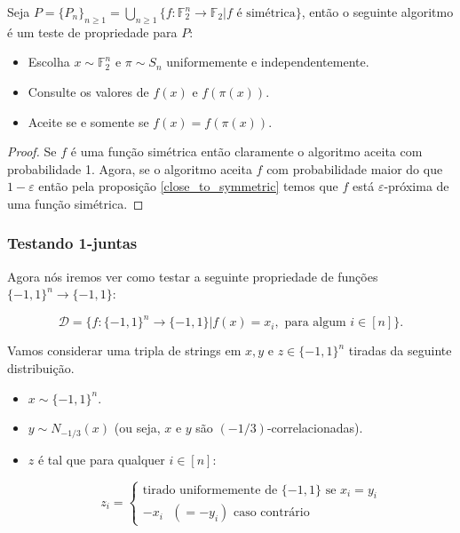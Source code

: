 \begin{teo}

Seja $P = \{P_{n}\}_{n \geq 1} = \bigcup_{n \geq 1}\{ f: \mathbb{F}_{2}^{n} \to \mathbb{F}_{2} \lvert f \text{ é simétrica} \}$, então o seguinte algoritmo é um teste de propriedade para $P$:

\begin{itemize}

	\item Escolha $x \sim \mathbb{F}_{2}^{n}$ e $\pi \sim S_{n}$ uniformemente e independentemente.
	
	\item Consulte os valores de $f(x)$ e $f(\pi(x))$.
	
	\item Aceite se e somente se $f(x) = f(\pi(x))$.

\end{itemize}

\end{teo}

\begin{proof}

Se $f$ é uma função simétrica então claramente o algoritmo aceita com probabilidade 1. Agora, se o algoritmo aceita $f$ com probabilidade maior do que $1 - \varepsilon$ então pela proposição \ref{close_to_symmetric} temos que $f$ está $\varepsilon$-próxima de uma função simétrica.

\end{proof}

\subsubsection{Testando 1-juntas}

Agora nós iremos ver como testar a seguinte propriedade de funções $\{-1, 1\}^{n} \to \{-1, 1\}$:

\begin{equation*}
	\mathcal{D} = \{f: \{-1, 1\}^{n} \to \{-1, 1\} \lvert f(x) = x_{i}, \text{ para algum } i \in [n]\}.
\end{equation*}

Vamos considerar uma tripla de strings em $x, y$ e $z \in \{-1, 1\}^{n}$ tiradas da seguinte distribuição.

\begin{itemize}

	\item $x \sim \{-1, 1\}^{n}$.
	
	\item $y \sim N_{-1/3}(x)$ (ou seja, $x$ e $y$ são $(-1/3)$-correlacionadas).
	
	\item $z$ é tal que para qualquer $i \in [n]$:
	
	\begin{equation*}
		z_{i} = \begin{cases}
				\text{tirado uniformemente de } \{-1, 1\} \text{ se } x_{i} = y_{i} \\
				-x_{i} \text{ } (= - y_{i}) \text{ caso contrário}
			  \end{cases}
	\end{equation*}

\end{itemize}

